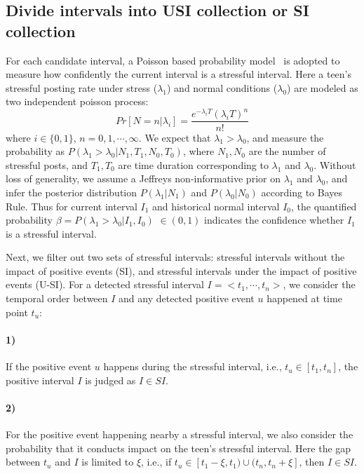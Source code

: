 \subsection{Divide intervals into USI collection or SI collection}
\label{alg:alg2}
For each candidate interval,
a Poisson based probability model~\cite{Li2017Analyzing} is adopted to measure how confidently the current interval is a stressful interval.
Here a teen's stressful posting rate under stress ($\lambda_1$) and normal conditions ($\lambda_0$) are modeled as two independent poisson process:
\begin{equation}
Pr[N=n|\lambda_i]=\frac{e^{-\lambda_i T}{(\lambda_i T)}^n}{n!}
\end{equation}
where $i\in\{0,1\}$, $n=0,1,\cdots,\infty$.
We expect that $\lambda_1 > \lambda_0$, and measure the probability as $P(\lambda_1>\lambda_0|N_1, T_1, N_0, T_0)$,
where $N_1, N_0$ are the number of stressful posts, and $T_1, T_0$ are time duration corresponding to $\lambda_1$ and $\lambda_0$.
Without loss of generality, we assume a Jeffreys non-informative prior on $\lambda_1$ and $\lambda_0$,
and infer the posterior distribution $P(\lambda_1|N_1)$ and $P(\lambda_0|N_0)$ according to Bayes Rule.
Thus for current interval $I_1$ and historical normal interval $I_0$,
the quantified probability $\beta = P(\lambda_1>\lambda_0|I_1,I_0)$ $\in (0,1)$ indicates the confidence whether $I_1$ is a stressful interval.

Next, we filter out two sets of stressful intervals: stressful intervals without the impact of positive events (SI),
and stressful intervals under the impact of positive events (U-SI).
For a detected stressful interval $I = <t_1,\cdots,t_n>$, we consider the temporal order between $I$ and any detected positive event $u$ happened at time point $t_u$:
\paragraph{1)} If the positive event $u$ happens during the stressful interval, i.e., $t_u \in [t_1,t_n]$, the positive interval $I$ is judged as $I \in SI$.
\paragraph{2)} For the positive event happening nearby a stressful interval,
we also consider the probability that it conducts impact on the teen's stressful interval.
Here the gap between $t_u$ and $I$ is limited to $\xi$, i.e.,
if $t_u \in [t_{1}-\xi, t_1)\cup(t_{n},t_{n}+\xi]$, then $I \in SI$.

